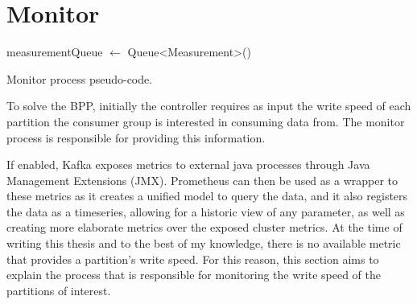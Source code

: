 \section{Monitor} \label{component:Monitor}

\IncMargin{1em} 
\begin{algorithm}[h]
    \BlankLine

    measurementQueue $\gets$ Queue<Measurement>()\; 
    \caption{Monitor process pseudo-code.}
\label{algo:monitor} \end{algorithm}\DecMargin{1em}

To solve the BPP, initially the controller requires as input the write speed of
each partition the consumer group is interested in consuming data from. The
monitor process is responsible for providing this information.

If enabled, Kafka exposes metrics to external java processes through Java
Management Extensions (JMX). Prometheus can then be used as a wrapper to these
metrics as it creates a unified model to query the data, and it also registers
the data as a timeseries, allowing for a historic view of any parameter, as well
as creating more elaborate metrics over the exposed cluster metrics. At the time
of writing this thesis and to the best of my knowledge, there is no available
metric that provides a partition's write speed.  For this reason, this section
aims to explain the process that is responsible for monitoring the write speed
of the partitions of interest.

